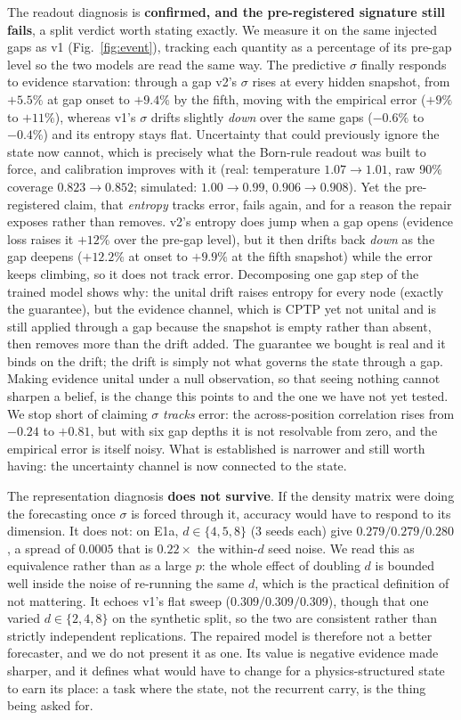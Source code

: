 \documentclass[journal]{IEEEtran}
\begin{document}
The readout diagnosis is \textbf{confirmed, and the pre-registered signature still
fails}, a split verdict worth stating exactly. We measure it on the same injected
gaps as v1 (Fig.~\ref{fig:event}), tracking each quantity as a percentage of its
pre-gap level so the two models are read the same way. The predictive $\sigma$
finally responds to evidence starvation: through a gap v2's $\sigma$ rises at every
hidden snapshot, from $+5.5\%$ at gap onset to $+9.4\%$ by the fifth, moving with the
empirical error ($+9\%$ to $+11\%$), whereas v1's $\sigma$ drifts slightly \emph{down}
over the same gaps ($-0.6\%$ to $-0.4\%$) and its entropy stays flat. Uncertainty
that could previously ignore the state now cannot, which is precisely what the
Born-rule readout was built to force, and calibration improves with it (real:
temperature $1.07 \to 1.01$, raw 90\% coverage $0.823 \to 0.852$; simulated:
$1.00 \to 0.99$, $0.906 \to 0.908$). Yet the pre-registered claim, that
\emph{entropy} tracks error, fails again, and for a reason the repair exposes rather
than removes. v2's entropy does jump when a gap opens (evidence loss raises it $+12\%$
over the pre-gap level), but it then drifts back \emph{down} as the gap deepens
($+12.2\%$ at onset to $+9.9\%$ at the fifth snapshot) while the error keeps climbing,
so it does not track error. Decomposing one gap step of the trained model shows why:
the unital drift raises entropy for every node (exactly the guarantee), but the
evidence channel, which is CPTP yet not unital and is still applied through a gap because the
snapshot is empty rather than absent, then removes more than the drift added. The
guarantee we bought is real and it binds on the drift; the drift is simply not what
governs the state through a gap. Making evidence unital under a null observation, so
that seeing nothing cannot sharpen a belief, is the change this points to and the one
we have not yet tested. We stop short of claiming $\sigma$ \emph{tracks} error: the
across-position correlation rises from $-0.24$ to $+0.81$, but with six gap depths it
is not resolvable from zero, and the empirical error is itself noisy. What is
established is narrower and still worth having: the uncertainty channel is now
connected to the state.

The representation diagnosis \textbf{does not survive}. If the density matrix were
doing the forecasting once $\sigma$ is forced through it, accuracy would have to
respond to its dimension. It does not: on E1a, $d\in\{4,5,8\}$ (3 seeds each) give
$0.279/0.279/0.280$, a spread of $0.0005$ that is $0.22\times$ the within-$d$ seed
noise. We read this as equivalence rather than as a large $p$: the whole effect of
doubling $d$ is bounded well inside the noise of re-running the same $d$, which is
the practical definition of not mattering. It echoes v1's flat sweep
($0.309/0.309/0.309$), though that one varied $d\in\{2,4,8\}$ on the synthetic
split, so the two are consistent rather than strictly independent replications.
The repaired model is therefore not a better forecaster, and we do not present it as
one. Its value is negative evidence made sharper, and it defines what would have to
change for a physics-structured state to earn its place: a task where the state, not
the recurrent carry, is the thing being asked for.
\end{document}
